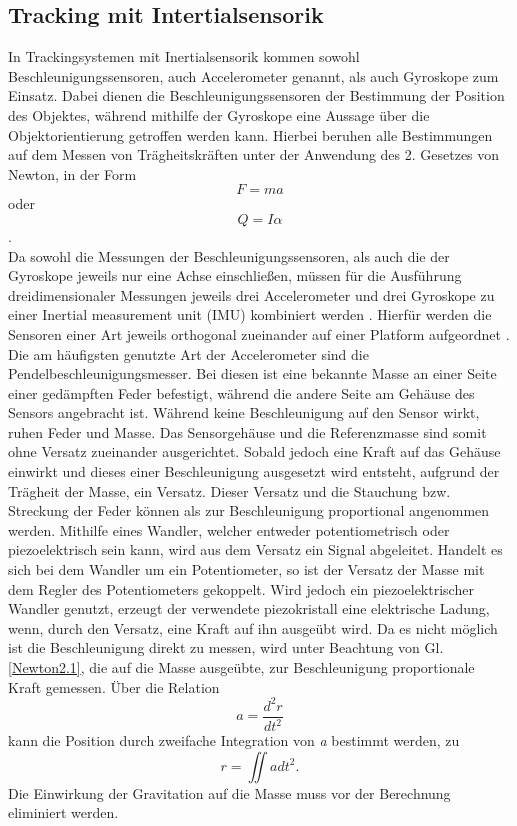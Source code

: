 \subsection{Tracking mit Intertialsensorik}
In Trackingsystemen mit Inertialsensorik kommen sowohl Beschleunigungssensoren, auch Accelerometer genannt, als auch Gyroskope zum Einsatz. Dabei dienen die Beschleunigungssensoren der Bestimmung der Position des Objektes, während mithilfe der Gyroskope eine Aussage über die Objektorientierung getroffen werden kann. \cite{P24}
Hierbei beruhen alle Bestimmungen auf dem Messen von Trägheitskräften \cite{P32} unter der Anwendung des 2. Gesetzes von Newton, in der Form
\begin{equation}\label{Newton2.1}
    F = ma
\end{equation} oder
\begin{equation}\label{Newton2.2.}
   Q = I\alpha
\end{equation} \cite{P24}.
\\Da sowohl die Messungen der Beschleunigungssensoren, als auch die der Gyroskope jeweils nur eine Achse einschließen, müssen für die Ausführung dreidimensionaler Messungen jeweils drei Accelerometer und drei Gyroskope zu einer Inertial measurement unit (IMU) kombiniert werden \cite{P32}. Hierfür werden die Sensoren einer Art jeweils orthogonal zueinander auf einer Platform aufgeordnet \cite{P24}.
\\Die am häufigsten genutzte Art der Accelerometer sind die Pendelbeschleunigungsmesser. Bei diesen ist eine bekannte Masse an einer Seite einer gedämpften Feder befestigt, während die andere Seite am Gehäuse des Sensors angebracht ist. \cite{P32}
Während keine Beschleunigung auf den Sensor wirkt, ruhen Feder und Masse. Das Sensorgehäuse und die Referenzmasse sind somit ohne Versatz zueinander ausgerichtet. Sobald jedoch eine Kraft auf das Gehäuse einwirkt und dieses einer Beschleunigung ausgesetzt wird entsteht, aufgrund der Trägheit der Masse, ein Versatz.
Dieser Versatz und die Stauchung bzw. Streckung der Feder können als zur Beschleunigung proportional angenommen werden. Mithilfe eines Wandler, welcher entweder potentiometrisch oder piezoelektrisch sein kann, wird aus dem Versatz ein Signal abgeleitet. Handelt es sich bei dem Wandler um ein Potentiometer, so ist der Versatz der Masse mit dem Regler des Potentiometers gekoppelt. Wird jedoch ein piezoelektrischer Wandler genutzt, erzeugt der verwendete piezokristall eine elektrische Ladung, wenn, durch den Versatz, eine Kraft auf ihn ausgeübt wird.
Da es nicht möglich ist die Beschleunigung direkt zu messen, wird unter Beachtung von Gl. \ref{Newton2.1}, die auf die Masse ausgeübte, zur Beschleunigung proportionale Kraft gemessen. Über die Relation
\begin{equation}\label{beschl}
  a = \frac{d^2r}{dt^2}
\end{equation}
kann die Position durch zweifache Integration von \textit{a} bestimmt werden, zu
\begin{equation}\label{pos}
  r = \iint{a dt^2}.
\end{equation}
Die Einwirkung der Gravitation auf die Masse muss vor der Berechnung eliminiert werden.\cite{P24}


